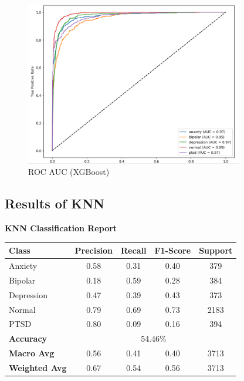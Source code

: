 \begin{figure}[h!]  
    \centering
    \includegraphics[width=0.85\textwidth]{Images/XG ROC.png}  
    \caption{ROC AUC (XGBoost)}
    \label{XGrOC}  %
\end{figure}


\subsection{Results of KNN}

\begin{center}
    \textbf{KNN Classification Report} \\[0.5em]
    \begin{tabular}{|l|c|c|c|c|}
        \hline
        \textbf{Class} & \textbf{Precision} & \textbf{Recall} & \textbf{F1-Score} & \textbf{Support} \\ \hline
        Anxiety        & 0.58               & 0.31            & 0.40              & 379              \\ \hline
        Bipolar        & 0.18               & 0.59            & 0.28              & 384              \\ \hline
        Depression     & 0.47               & 0.39            & 0.43              & 373              \\ \hline
        Normal         & 0.79               & 0.69            & 0.73              & 2183             \\ \hline
        PTSD           & 0.80               & 0.09            & 0.16              & 394              \\ \hline
        \textbf{Accuracy} & \multicolumn{4}{|c|}{54.46\%} \\ \hline
        \textbf{Macro Avg} & 0.56            & 0.41            & 0.40              & 3713             \\ \hline
        \textbf{Weighted Avg} & 0.67         & 0.54            & 0.56              & 3713             \\ \hline
    \end{tabular}
\end{center}

